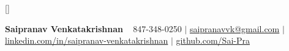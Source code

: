 \usepackage{newtxtext,newtxmath}

\pagestyle{fancy}
\fancyhf{}
\fancyfoot{}
\renewcommand{\headrulewidth}{0pt}
\renewcommand{\footrulewidth}{0pt}

\addtolength{\oddsidemargin}{-0.5in}
\addtolength{\evensidemargin}{-0.5in}
\addtolength{\textwidth}{1in}
\addtolength{\topmargin}{-0.25in}
\addtolength{\textheight}{0.5in}

\raggedbottom
\raggedright
\setlength{\tabcolsep}{0in}

\titleformat{\section}{\Large\bfseries\scshape\raggedright}{}{0em}{}[\titlerule]


\newcommand{\resumeItem}[1]{\item\small{#1} \vspace{-3pt}}
\newcommand{\resumeSubheading}[4]{
\vspace{-1.0pt}\item
  \begin{tabular*}{0.97\textwidth}[t]{l@{\extracolsep{\fill}}r}
    \textbf{#1} & #2 \
    #3 & #4 \
  \end{tabular*}\vspace{-7pt}
}
\newcommand{\resumeDegreeSubheading}[6]{
\vspace{-1.0pt}\item
  \begin{tabular*}{0.97\textwidth}[t]{l@{\extracolsep{\fill}}r}
    \textbf{#1} & #2 \
    #3 & #4 \
    #5 & #6 \
  \end{tabular*}\vspace{-7pt}
}

\renewcommand\labelitemii{$\vcenter{\hbox{\tiny$\bullet$}}$}
\newcommand{\resumeSubHeadingList}{\begin{itemize}[leftmargin=0.15in, label={}]}
\newcommand{\resumeSubHeadingListEnd}{\vspace{-6.4pt}\end{itemize}}



\begin{center}
  \textbf{\Huge Saipranav Venkatakrishnan} \
  \vspace{0.2em}
  \large 847-348-0250 $|$ \href{mailto:saipranavvk@gmail.com}{saipranavvk@gmail.com} $|$
  \href{https://www.linkedin.com/in/saipranav-venkatakrishnan}{linkedin.com/in/saipranav-venkatakrishnan} $|$
  \href{https://github.com/Sai-Pra}{github.com/Sai-Pra}
\end{center}

